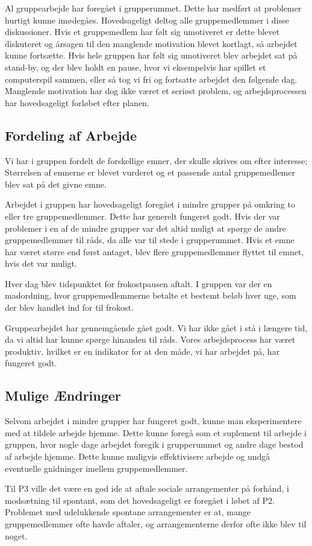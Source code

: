 Al gruppearbejde har foreg\aa{}et i grupperummet. Dette har medf\o{}rt at problemer hurtigt kunne im\o{}deg\aa{}es. 
Hovedsageligt deltog alle gruppemedlemmer i disse diskussioner.
Hvis et gruppemedlem har f\o{}lt sig umotiveret er dette blevet diskuteret og \aa{}rsagen til den manglende motivation blevet kortlagt, s\aa{} arbejdet kunne forts\ae{}tte.
Hvis hele gruppen har f\o{}lt sig umotiveret blev arbejdet sat p\aa{} stand-by, og der blev holdt en pause, hvor vi eksempelvis har spillet et computerspil sammen, eller s\aa{} tog vi fri og fortsatte arbejdet den f\o{}lgende dag.
Manglende motivation har dog ikke v\ae{}ret et seri\o{}st problem, og arbejdsprocessen har hovedsageligt forl\o{}bet efter planen.

\subsection{Fordeling af Arbejde}

Vi har i gruppen fordelt de forskellige emner, der skulle skrives om efter interesse; St\o{}rrelsen af emnerne er blevet vurderet og et passende antal gruppemedlemer blev sat p\aa{} det givne emne.

Arbejdet i gruppen har hovedsageligt foreg\aa{}et i mindre grupper p\aa{} omkring to eller tre gruppemedlemmer. Dette har generelt fungeret godt. 
Hvis der var problemer i en af de mindre grupper var det altid muligt at sp\o{}rge de andre gruppemedlemmer til r\aa{}ds, da alle var til stede i grupperummet.
Hvis et emne har v\ae{}ret st\o{}rre end f\o{}rst antaget, blev flere gruppemedlemmer flyttet til emnet, hvis det var muligt.

Hver dag blev tidspunktet for frokostpausen aftalt. I gruppen var der en madordning, hvor gruppemedlemmerne betalte et bestemt bel\o{}b hver uge, som der blev handlet ind for til frokost. 

Gruppearbejdet har gennemg\aa{}ende g\aa{}et godt. Vi har ikke g\aa{}et i st\aa{} i l\ae{}ngere tid, da vi altid har kunne sp\o{}rge hinanden til r\aa{}ds. Vores arbejdsprocess har v\ae{}ret produktiv, hvilket er en indikator for at den m\aa{}de, vi har arbejdet p\aa{}, har fungeret godt.

\subsection{Mulige \AE{}ndringer}

Selvom arbejdet i mindre grupper har fungeret godt, kunne man eksperimentere med at tildele arbejde hjemme. Dette kunne foreg\aa{} som et suplement til arbejde i gruppen, hvor nogle dage arbejdet foregik i grupperummet og andre dage bestod af arbejde hjemme.
Dette kunne muligvis effektivisere arbejde og undg\aa{} eventuelle gnidninger imellem gruppemedlemmer.

Til P3 ville det v\ae{}re en god ide at aftale sociale arrangementer p\aa{} forh\aa{}nd, i mods\ae{}tning til spontant, som det hovedsageligt er foreg\aa{}et i l\o{}bet af P2. 
Problemet med udelukkende spontane arrangementer er at, mange gruppemedlemmer ofte havde aftaler, og arrangementerne derfor ofte ikke blev til noget.